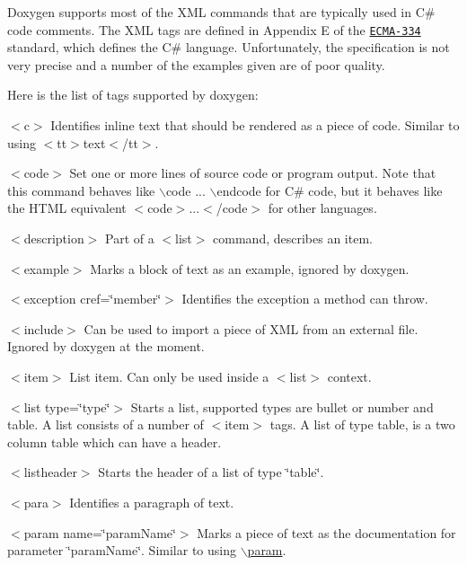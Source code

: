 Doxygen supports most of the XML commands that are typically used in C\# code comments. The XML tags are defined in Appendix E of the \href{http://www.ecma-international.org/publications/standards/Ecma-334.htm}{\tt ECMA-\/334} standard, which defines the C\# language. Unfortunately, the specification is not very precise and a number of the examples given are of poor quality.

Here is the list of tags supported by doxygen:


\begin{DoxyItemize}
\item {\ttfamily $<$c$>$} Identifies inline text that should be rendered as a piece of code. Similar to using {\ttfamily $<$tt$>$}text{\ttfamily $<$/tt$>$}. 
\item {\ttfamily $<$code$>$} Set one or more lines of source code or program output. Note that this command behaves like {\ttfamily $\backslash$code ... $\backslash$endcode} for C\# code, but it behaves like the HTML equivalent {\ttfamily $<$code$>$...$<$/code$>$} for other languages. 
\item {\ttfamily $<$description$>$} Part of a {\ttfamily $<$list$>$} command, describes an item. 
\item {\ttfamily $<$example$>$} Marks a block of text as an example, ignored by doxygen. 
\item {\ttfamily $<$exception cref=\char`\"{}member\char`\"{}$>$} Identifies the exception a method can throw. 
\item {\ttfamily $<$include$>$} Can be used to import a piece of XML from an external file. Ignored by doxygen at the moment. 
\item {\ttfamily $<$item$>$} List item. Can only be used inside a {\ttfamily $<$list$>$} context. 
\item {\ttfamily $<$list type=\char`\"{}type\char`\"{}$>$} Starts a list, supported types are {\ttfamily bullet} or {\ttfamily number} and {\ttfamily table}. A list consists of a number of {\ttfamily $<$item$>$} tags. A list of type table, is a two column table which can have a header. 
\item {\ttfamily $<$listheader$>$} Starts the header of a list of type \char`\"{}table\char`\"{}. 
\item {\ttfamily $<$para$>$} Identifies a paragraph of text. 
\item {\ttfamily $<$param name=\char`\"{}paramName\char`\"{}$>$} Marks a piece of text as the documentation for parameter \char`\"{}paramName\char`\"{}. Similar to using \hyperlink{commands_cmdparam}{$\backslash$param}. 

\end{DoxyItemize}
